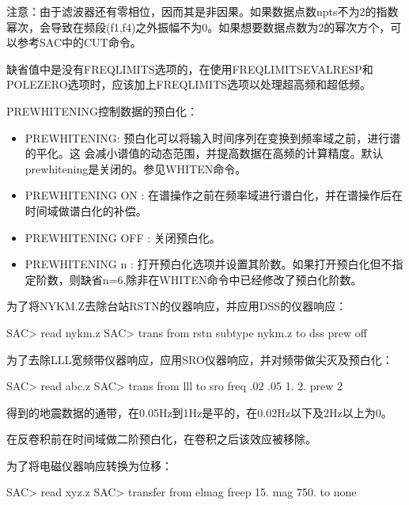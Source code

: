 注意：由于滤波器还有零相位，因而其是非因果。如果数据点数npts不为2的指数幂次，会导致在频段(f1,f4)之外振幅不为0。如果想要数据点数为2的幂次方个，可以参考SAC中的CUT命令。

缺省值中是没有FREQLIMITS选项的，在使用FREQLIMITSEVALRESP和POLEZERO选项时，应该加上FREQLIMITS选项以处理超高频和超低频。

PREWHITENING控制数据的预白化：
\begin{itemize}
\item PREWHITENING: 预白化可以将输入时间序列在变换到频率域之前，进行谱的平化。这	会减小谱值的动态范围，并提高数据在高频的计算精度。默认prewhitening是关闭的。参见WHITEN命令。
\item PREWHITENING ON : 在谱操作之前在频率域进行谱白化，并在谱操作后在时间域做谱白化的补偿。
\item PREWHITENING OFF : 关闭预白化。
\item PREWHITENING n : 打开预白化选项并设置其阶数。如果打开预白化但不指定阶数，则缺省n=6,除非在WHITEN命令中已经修改了预白化阶数。
\end{itemize}

为了将NYKM.Z去除台站RSTN的仪器响应，并应用DSS的仪器响应：
\begin{SACCode}
SAC> read nykm.z
SAC> trans from rstn subtype nykm.z to dss prew off
\end{SACCode}  	

为了去除LLL宽频带仪器响应，应用SRO仪器响应，并对频带做尖灭及预白化：
\begin{SACCode}
SAC> read abc.z
SAC> trans from lll to sro freq .02 .05 1. 2. prew 2
\end{SACCode}
得到的地震数据的通带，在0.05Hz到1Hz是平的，在0.02Hz以下及2Hz以上为0。

在反卷积前在时间域做二阶预白化，在卷积之后该效应被移除。

为了将电磁仪器响应转换为位移：
\begin{SACCode}
SAC>  read xyz.z
SAC>  transfer from elmag freep 15. mag 750. to none
\end{SACCode}
